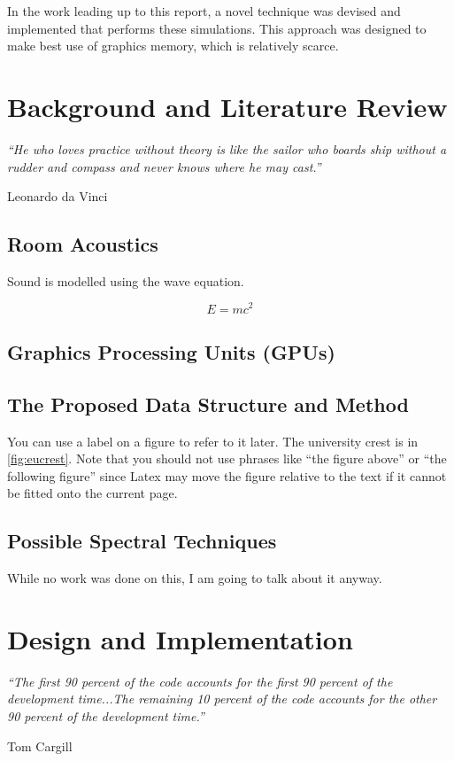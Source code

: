 \documentclass[12pt,a4paper]{article}
\begin{document}
In the work leading up to this report, a novel technique was devised and implemented that performs these simulations. This approach was designed to make best use of graphics memory, which is relatively scarce.

\newpage
\section{Background and Literature Review}

\epigraph{\itshape ``He who loves practice without theory is like the sailor who boards ship without a rudder and compass and never knows where he may cast.''}{Leonardo da Vinci}

\subsection{Room Acoustics}

Sound is modelled using the wave equation.

\begin{displaymath}
E=mc^{2}
\end{displaymath}

\subsection{Graphics Processing Units (GPUs)}

\subsection{The Proposed Data Structure and Method}

You can use a label on a figure to refer to it later. The university
crest is in \ref{fig:eucrest}. Note that you should not use phrases like
``the figure above'' or ``the following figure'' since Latex may move
the figure relative to the text if it cannot be fitted onto the current page.

\subsection{Possible Spectral Techniques}
While no work was done on this, I am going to talk about it anyway.

\newpage
\section{Design and Implementation}
\epigraph{\itshape ``The first 90 percent of the code accounts for the first 90 percent of the development time...The remaining 10 percent of the code accounts for the other 90 percent of the development time.''}{Tom Cargill}
\end{document}
